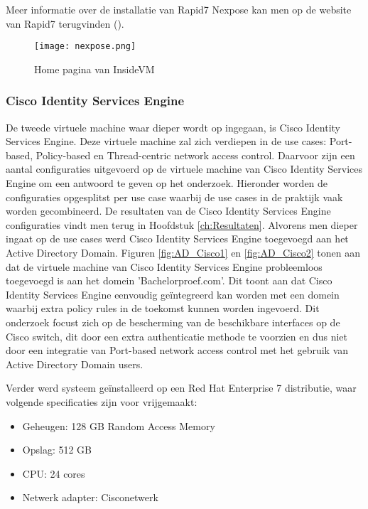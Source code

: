 Meer informatie over de installatie van Rapid7 Nexpose kan men op de website van Rapid7 terugvinden (\cite{rapid7}).

\begin{figure}[H]
	\centering
	\texttt{[image: nexpose.png]}
	\caption{Home pagina van InsideVM}%
	\label{fig:nexpose}%
\end{figure}
\newpage
\subsubsection{Cisco Identity Services Engine}
De tweede virtuele machine waar dieper wordt op ingegaan, is Cisco Identity Services Engine. Deze virtuele machine zal zich verdiepen in de use cases: Port-based, Policy-based en Thread-centric network access control. Daarvoor zijn een aantal configuraties uitgevoerd op de virtuele machine van Cisco Identity Services Engine om een antwoord te geven op het onderzoek. Hieronder worden de configuraties opgesplitst per use case waarbij de use cases in de praktijk vaak worden gecombineerd. De resultaten van de Cisco Identity Services Engine configuraties vindt men terug in Hoofdstuk \ref{ch:Resultaten}.
\newline
\newline
Alvorens men dieper ingaat op de use cases werd Cisco Identity Services Engine toegevoegd aan het Active Directory Domain. Figuren \ref{fig:AD_Cisco1} en \ref{fig:AD_Cisco2} tonen aan dat de virtuele machine van Cisco Identity Services Engine probleemloos toegevoegd is aan het domein 'Bachelorproef.com'. Dit toont aan dat Cisco Identity Services Engine eenvoudig geïntegreerd kan worden met een domein waarbij extra policy rules in de toekomst kunnen worden ingevoerd. Dit onderzoek focust zich op de bescherming van de beschikbare interfaces op de Cisco switch, dit door een extra authenticatie methode te voorzien en dus niet door een integratie van Port-based network access control met het gebruik van Active Directory Domain users.

Verder werd systeem geïnstalleerd op een Red Hat Enterprise 7 distributie, waar volgende specificaties zijn voor vrijgemaakt: 

\begin{itemize}
	\item Geheugen: 128 GB Random Access Memory
	\item Opslag: 512 GB
	\item CPU: 24 cores
	\item Netwerk adapter: Cisco\textunderscore netwerk
\end{itemize}

